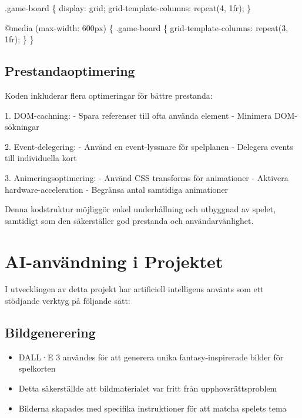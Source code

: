 \documentclass[a4paper,12pt]{article}
\begin{document}
\begin{codebox}
.game-board \{
    display: grid;
    grid-template-columns: repeat(4, 1fr);
\}

@media (max-width: 600px) \{
    .game-board \{
        grid-template-columns: repeat(3, 1fr);
    \}
\}
\end{codebox}

\subsection*{Prestandaoptimering}
Koden inkluderar flera optimeringar för bättre prestanda:

\begin{codebox}
1. DOM-cachning:
   - Spara referenser till ofta använda element
   - Minimera DOM-sökningar

2. Event-delegering:
   - Använd en event-lyssnare för spelplanen
   - Delegera events till individuella kort

3. Animeringsoptimering:
   - Använd CSS transforms för animationer
   - Aktivera hardware-acceleration
   - Begränsa antal samtidiga animationer
\end{codebox}

Denna kodstruktur möjliggör enkel underhållning och utbyggnad av spelet, samtidigt som den säkerställer god prestanda och användarvänlighet.

\section*{AI-användning i Projektet}
I utvecklingen av detta projekt har artificiell intelligens använts som ett stödjande verktyg på följande sätt:

\subsection*{Bildgenerering}
\begin{itemize}
    \item DALL·E 3 användes för att generera unika fantasy-inspirerade bilder för spelkorten
    \item Detta säkerställde att bildmaterialet var fritt från upphovsrättsproblem
    \item Bilderna skapades med specifika instruktioner för att matcha spelets tema
\end{itemize}
\end{document}
